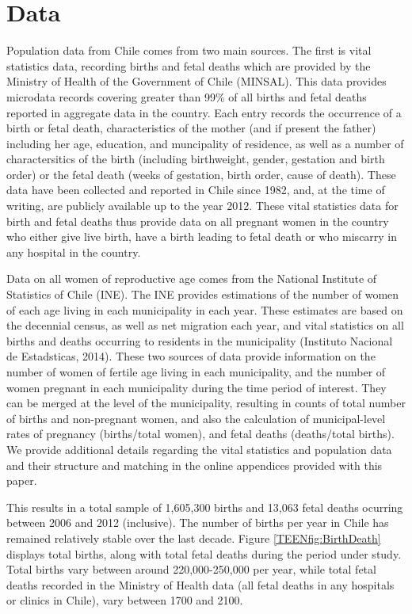 \section{Data}
\label{TEENscn:Data}
Population data from Chile comes from two main sources. The first is vital 
statistics data, recording births and fetal deaths which are provided by the 
Ministry of Health of the Government of Chile (MINSAL). This data provides 
microdata records covering greater than 99\% of all births and fetal deaths 
reported in aggregate data \citep{Bharadwajetal2013} in the country. Each entry 
records the occurrence of a birth or fetal death, characteristics of the mother 
(and if present the father) including her age, education, and muncipality of 
residence, as well as a number of charactersitics of the birth (including 
birthweight, gender, gestation and birth order) or the fetal death (weeks of 
gestation, birth order, cause of death). These data have been collected and 
reported in Chile since 1982, and, at the time of writing, are publicly 
available up to the year 2012. These vital statistics data for birth and
fetal deaths thus provide data on all pregnant women in the country who either 
give live birth, have a birth leading to fetal death or who miscarry in any 
hospital in the country.

Data on all women of reproductive age comes from the National Institute of 
Statistics of Chile (INE). The INE provides estimations of the number of women 
of each age living in each municipality in each year. These estimates are based 
on the decennial census, as well as net migration each year, and vital 
statistics on all births and deaths occurring to residents in the municipality 
(Instituto Nacional de Estadsticas, 2014). These two sources of data provide 
information on the number of women of fertile age living in each municipality, 
and the number of women pregnant in each municipality during the time period of 
interest. They can be merged at the level of the municipality, resulting in
counts of total number of births and non-pregnant women, and also the calculation 
of municipal-level rates of pregnancy (births/total women), and fetal deaths 
(deaths/total births).  We provide additional details regarding the vital 
statistics and population data and their structure and matching in the online
appendices provided with this paper.

This results in a total sample of 1,605,300 births and 13,063 fetal deaths
ocurring between 2006 and 2012 (inclusive).  The number of births per year in 
Chile has remained relatively stable over the last decade.  
Figure \ref{TEENfig:BirthDeath} displays total births, along with total fetal 
deaths during the period under study.  Total births vary between around 
220,000-250,000 per year, while total fetal deaths recorded in the Ministry of 
Health data (all fetal deaths in any hospitals or clinics in Chile), vary between 
1700 and 2100.



